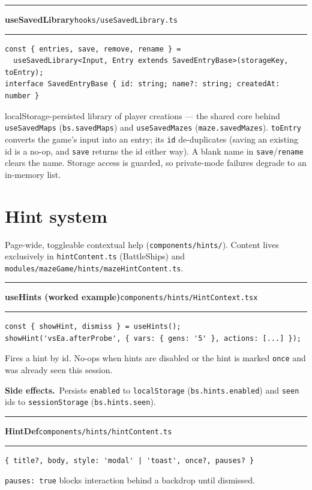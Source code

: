 \documentclass[11pt,a4paper]{report}
\newcommand{\srcfile}[1]{\texttt{\small #1}}   %
\newcommand{\ts}[1]{\texttt{#1}}               %
\newenvironment{apientry}[2]{%
  \par\medskip\noindent
  \begin{minipage}{\textwidth}
  \hrule\vspace{0.6ex}
  {\large\ttfamily\bfseries #1}\hfill{\footnotesize\srcfile{#2}}
  \vspace{0.4ex}\hrule\medskip
}{%
  \end{minipage}\par\medskip
}
\newcommand{\apifield}[1]{\par\smallskip\noindent\textbf{#1.}\ }
\begin{document}
\begin{apientry}{useSavedLibrary}{hooks/useSavedLibrary.ts}
\begin{lstlisting}
const { entries, save, remove, rename } =
  useSavedLibrary<Input, Entry extends SavedEntryBase>(storageKey, toEntry);
interface SavedEntryBase { id: string; name?: string; createdAt: number }
\end{lstlisting}
localStorage-persisted library of player creations --- the shared core
behind \ts{useSavedMaps} (\ts{bs.savedMaps}) and \ts{useSavedMazes}
(\ts{maze.savedMazes}). \ts{toEntry} converts the game's input into an
entry; its \ts{id} de-duplicates (saving an existing id is a no-op, and
\ts{save} returns the id either way). A blank name in
\ts{save}/\ts{rename} clears the name. Storage access is guarded, so
private-mode failures degrade to an in-memory list.
\end{apientry}

\section{Hint system}

Page-wide, toggleable contextual help
(\srcfile{components/hints/}). Content lives exclusively in
\srcfile{hintContent.ts} (BattleShips) and
\srcfile{modules/mazeGame/hints/mazeHintContent.ts}.

\begin{apientry}{useHints (worked example)}{components/hints/HintContext.tsx}
\begin{lstlisting}
const { showHint, dismiss } = useHints();
showHint('vsEa.afterProbe', { vars: { gens: '5' }, actions: [...] });
\end{lstlisting}
Fires a hint by id. No-ops when hints are disabled or the hint is marked
\ts{once} and was already seen this session.
\apifield{Side effects}Persists \ts{enabled} to \ts{localStorage}
(\ts{bs.hints.enabled}) and \ts{seen} ids to \ts{sessionStorage}
(\ts{bs.hints.seen}).
\end{apientry}

\begin{apientry}{HintDef}{components/hints/hintContent.ts}
\begin{lstlisting}
{ title?, body, style: 'modal' | 'toast', once?, pauses? }
\end{lstlisting}
\ts{pauses: true} blocks interaction behind a backdrop until dismissed.
\end{apientry}
\end{document}
